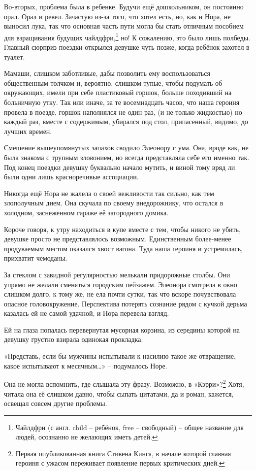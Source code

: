 \documentclass[
  a5paperpaper,
  DIV=11,
  numbers=noendperiod]{scrreprt}
\begin{document}
Во-вторых, проблема была в ребенке. Будучи ещё дошкольником, он
постоянно орал. Орал и ревел. Зачастую из-за того, что хотел есть, но,
как и Нора, не выносил лука, так что основная часть пути могла бы стать
отличным пособием для взращивания будущих чайлдфри,\footnote{Чайлдфри (с
  англ. child -- ребёнок, free -- свободный) -- общее название для
  людей, осознанно не желающих иметь детей.} но! К сожалению, это было
лишь полбеды. Главный сюрприз поездки открылся девушке чуть позже, когда
ребёнок захотел в туалет.

Мамаши, слишком заботливые, дабы позволить ему воспользоваться
общественным толчком и, вероятно, слишком тупые, чтобы подумать об
окружающих, имели при себе пластиковый горшок, больше походивший на
больничную утку. Так или иначе, за те восемнадцать часов, что наша
героиня провела в поезде, горшок наполнялся не один раз, (и не только
жидкостью) но каждый раз, вместе с содержимым, убирался под стол,
припасенный, видимо, до лучших времен.

Смешение вышеупомянутых запахов сводило Элеонору с ума. Она, вроде как,
не была знакома с трупным зловонием, но всегда представляла себе его
именно так. Под конец поездки девушку буквально начало мутить, и виной
тому вряд ли были одни лишь красноречивые ассоциации.

Никогда ещё Нора не жалела о своей вежливости так сильно, как тем
злополучным днем. Она скучала по своему внедорожнику, что остался в
холодном, заснеженном гараже её загородного домика.

Короче говоря, к утру находиться в купе вместе с тем, чтобы никого не
убить, девушке просто не представлялось возможным. Единственным
более-менее продуваемым местом оказался хвост вагона. Туда наша героиня
и устремилась, прихватит чемоданы.

За стеклом с завидной регулярностью мелькали придорожные столбы. Они
упрямо не желали сменяться городским пейзажем. Элеонора смотрела в окно
слишком долго, к тому же, не ела почти сутки, так что вскоре
почувствовала опасное головокружение. Перспектива потерять сознание
рядом с кучкой дерьма казалась ей не самой удачной, и Нора перевела
взгляд.

Ей на глаза попалась перевернутая мусорная корзина, из середины которой
на девушку грустно взирала одинокая прокладка.

«Представь, если бы мужчины испытывали к насилию такое же отвращение,
какое испытывают к месячным\ldots» -- подумалось Норе.

Она не могла вспомнить, где слышала эту фразу. Возможно, в
«Кэрри»?\footnote{Первая опубликованная книга Стивена Кинга, в начале
  которой главная героиня с ужасом переживает появление первых
  критических дней.} Хотя, читала она её слишком давно, чтобы сыпать
цитатами, да и роман, кажется, освещал совсем другие проблемы.
\end{document}
